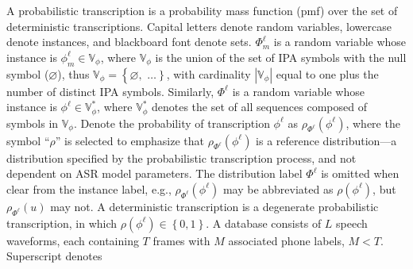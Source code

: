A probabilistic transcription is a probability mass function (pmf)
over the set of deterministic transcriptions.  Capital letters
denote random variables, lowercase denote instances, and
blackboard font denote sets.  $\Phi^{\ell}_m$ is a random variable
whose instance is $\phi_m^\ell\in\mathbb{V}_\phi$, where $\mathbb{V}_\phi$
is the union of the set of IPA symbols with the null symbol
($\varnothing$), thus $\mathbb{V}_\phi =\left\{\right.\varnothing,$
\ipa{[a],[i],[2],[\ae],}$\left.\ldots\right\}$, with cardinality
$|\mathbb{V}_\phi|$ equal to one plus the number of distinct IPA
symbols.  Similarly, $\Phi^{\ell}$ is a random variable whose instance
is $\phi^{\ell}\in\mathbb{V}_\phi^*$, where $\mathbb{V}_\phi^*$ denotes
the set of all sequences composed of symbols in $\mathbb{V}_\phi$.  
Denote the probability of transcription $\phi^{\ell}$ as
$\rho_{\Phi^\ell}(\phi^{\ell})$, where the symbol ``$\rho$'' is
selected to emphasize that $\rho_{\Phi^\ell}(\phi^{\ell})$ is a
reference distribution---a distribution specified by the probabilistic
transcription process, and not dependent on ASR model
parameters.  The distribution label $\Phi^\ell$ is omitted when clear
from the instance label, e.g., $\rho_{\Phi^\ell}(\phi^\ell)$ may be
abbreviated as $\rho(\phi^\ell)$, but $\rho_{\Phi^\ell}(u)$ may not.
A deterministic transcription is a degenerate probabilistic
transcription, in which $\rho(\phi^\ell)\in\left\{0,1\right\}$.
A database consists of $L$ speech waveforms, each containing $T$
frames with $M$ associated phone labels, $M<T$.  Superscript denotes
